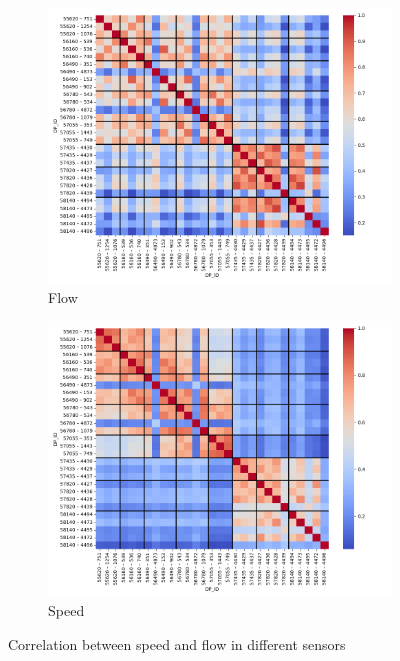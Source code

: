 	\begin{figure}[H]
		\centering
		\begin{subfigure}{0.9 \linewidth}
			\includegraphics[width=\textwidth]{../Plots/Flow/sensor_corr_by_portal}
			\caption{Flow}
		\end{subfigure}
		\begin{subfigure}{0.9 \linewidth}
			\includegraphics[width=\textwidth]{../Plots/Speed/sensor_corr_by_portal}
			\caption{Speed}
		\end{subfigure}
		\caption{Correlation between speed and flow in different sensors}
		\label{fig:sensor_corr_by_portal_big}
	\end{figure}
